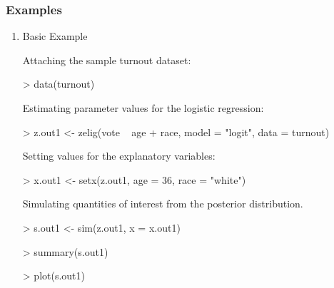 \subsubsection{Examples}
\begin{enumerate}
\item {Basic Example}
 
Attaching the sample turnout dataset:
\begin{Schunk}
\begin{Sinput}
> data(turnout)
\end{Sinput}
\end{Schunk}
Estimating parameter values for the logistic regression:
\begin{Schunk}
\begin{Sinput}
> z.out1 <- zelig(vote ~ age + race, model = "logit", data = turnout)
\end{Sinput}
\end{Schunk}
Setting values for the explanatory variables:
\begin{Schunk}
\begin{Sinput}
> x.out1 <- setx(z.out1, age = 36, race = "white")
\end{Sinput}
\end{Schunk}
Simulating quantities of interest from the posterior distribution.
\begin{Schunk}
\begin{Sinput}
> s.out1 <- sim(z.out1, x = x.out1)
\end{Sinput}
\end{Schunk}
\begin{Schunk}
\begin{Sinput}
> summary(s.out1)
\end{Sinput}
\end{Schunk}
\begin{center}
\begin{Schunk}
\begin{Sinput}
> plot(s.out1)
\end{Sinput}
\end{Schunk}

\end{center}
\end{enumerate}

